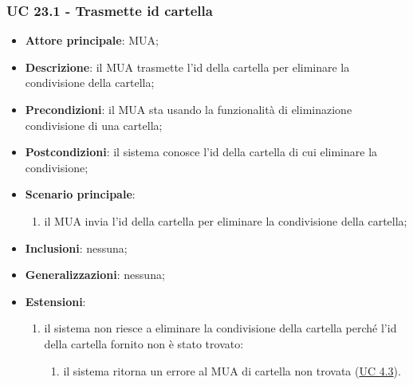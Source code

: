     \subsubsection{UC 23.1 - Trasmette id cartella} \label{sec:UC23.1}
    \begin{itemize}
        \item \textbf{Attore principale}: MUA;
        \item \textbf{Descrizione}: il MUA trasmette l'id della cartella per eliminare la condivisione della cartella;
        \item \textbf{Precondizioni}: il MUA sta usando la funzionalità di eliminazione condivisione di una cartella;
        \item \textbf{Postcondizioni}: il sistema conosce l'id della cartella di cui eliminare la condivisione;
        \item \textbf{Scenario principale}:
            \begin{enumerate}
                \item il MUA invia l'id della cartella per eliminare la condivisione della cartella;
            \end{enumerate}
        \item \textbf{Inclusioni}: nessuna;
        \item \textbf{Generalizzazioni}: nessuna;
        \item \textbf{Estensioni}:
            \begin{enumerate}[label=\alph*.]
                \item il sistema non riesce a eliminare la condivisione della cartella perché l'id della cartella fornito non è stato trovato:
                \begin{enumerate}[label=\arabic*.]
                    \item il sistema ritorna un errore al MUA di cartella non trovata (\hyperref[sec:UC4.3]{UC 4.3}).
                \end{enumerate}
            \end{enumerate}
    \end{itemize}


